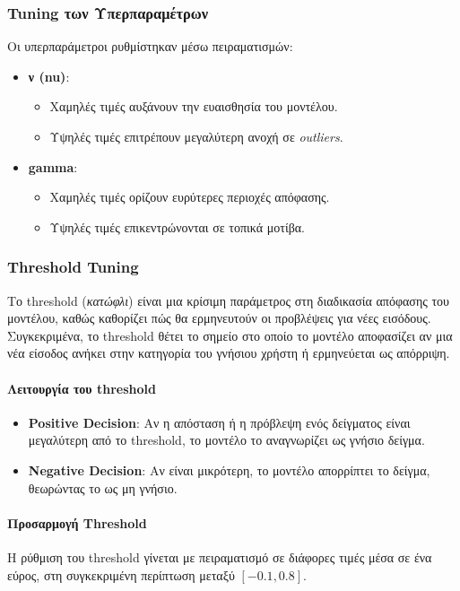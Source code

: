\subsubsection{Tuning των Υπερπαραμέτρων}

Οι υπερπαράμετροι ρυθμίστηκαν μέσω πειραματισμών:
\begin{itemize}
    \item \textbf{ν (nu)}: 
    \begin{itemize}
        \item Χαμηλές τιμές αυξάνουν την ευαισθησία του μοντέλου.
        \item Υψηλές τιμές επιτρέπουν μεγαλύτερη ανοχή σε \textit{outliers}.
    \end{itemize}
    \item \textbf{gamma}:
    \begin{itemize}
        \item Χαμηλές τιμές ορίζουν ευρύτερες περιοχές απόφασης.
        \item Υψηλές τιμές επικεντρώνονται σε τοπικά μοτίβα.
    \end{itemize}
\end{itemize}

\subsubsection{Threshold Tuning}

Το threshold (\emph{κατώφλι}) είναι μια κρίσιμη παράμετρος στη διαδικασία απόφασης του μοντέλου, καθώς καθορίζει πώς θα ερμηνευτούν οι προβλέψεις για νέες εισόδους. Συγκεκριμένα, το threshold θέτει το σημείο στο οποίο το μοντέλο αποφασίζει αν μια νέα είσοδος ανήκει στην κατηγορία του γνήσιου χρήστη ή ερμηνεύεται ως απόρριψη.

\paragraph{Λειτουργία του threshold}
\begin{itemize}
    \item \textbf{Positive Decision}: Αν η απόσταση ή η πρόβλεψη ενός δείγματος είναι μεγαλύτερη από το threshold, το μοντέλο το αναγνωρίζει ως γνήσιο δείγμα.
    \item \textbf{Negative Decision}: Αν είναι μικρότερη, το μοντέλο απορρίπτει το δείγμα, θεωρώντας το ως μη γνήσιο.
\end{itemize}

\paragraph{Προσαρμογή Threshold}
Η ρύθμιση του threshold γίνεται με πειραματισμό σε διάφορες τιμές μέσα σε ένα εύρος, στη συγκεκριμένη περίπτωση μεταξύ \([-0.1, 0.8]\).

